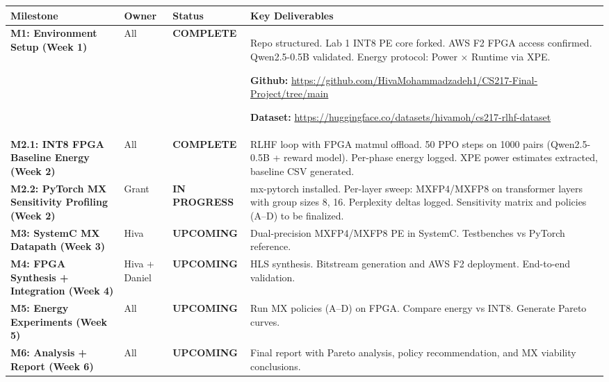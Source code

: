 \documentclass[10pt]{article}
\begin{document}
\begin{table}[H]
\raggedright
\footnotesize
\setlength{\tabcolsep}{4pt}
\renewcommand{\arraystretch}{1.1}
\begin{tabular}{@{}p{3cm}p{1.2cm}p{1.6cm}p{7.5cm}@{}}
\toprule
\textbf{Milestone} & \textbf{Owner} & \textbf{Status} & \textbf{Key Deliverables} \\
\midrule
\textbf{M1: Environment Setup (Week 1)} & All & \cellcolor{green!30}\textbf{COMPLETE} &
Repo structured. Lab 1 INT8 PE core forked. AWS F2 FPGA access confirmed. Qwen2.5-0.5B validated. Energy protocol: Power × Runtime via XPE.

\textbf{Github:} \scriptsize\url{https://github.com/HivaMohammadzadeh1/CS217-Final-Project/tree/main}

\textbf{Dataset:} \scriptsize\url{https://huggingface.co/datasets/hivamoh/cs217-rlhf-dataset} \\
\midrule
\textbf{M2.1: INT8 FPGA Baseline Energy (Week 2)} & All & \cellcolor{green!30}\textbf{COMPLETE} &
RLHF loop with FPGA matmul offload. 50 PPO steps on 1000 pairs (Qwen2.5-0.5B + reward model). Per-phase energy logged. XPE power estimates extracted, baseline CSV generated. \\
\midrule
\textbf{M2.2: PyTorch MX Sensitivity Profiling (Week 2)} & Grant & \cellcolor{orange!50}\textbf{IN PROGRESS} &
mx-pytorch installed. Per-layer sweep: MXFP4/MXFP8 on transformer layers with group sizes 8, 16. Perplexity deltas logged. Sensitivity matrix and policies (A--D) to be finalized. \\
\midrule
\textbf{M3: SystemC MX Datapath (Week 3)} & Hiva & \cellcolor{gray!30}\textbf{UPCOMING} &
Dual-precision MXFP4/MXFP8 PE in SystemC. Testbenches vs PyTorch reference. \\
\midrule
\textbf{M4: FPGA Synthesis + Integration (Week 4)} & Hiva + Daniel & \cellcolor{gray!30}\textbf{UPCOMING} &
HLS synthesis. Bitstream generation and AWS F2 deployment. End-to-end validation. \\
\midrule
\textbf{M5: Energy Experiments (Week 5)} & All & \cellcolor{gray!30}\textbf{UPCOMING} &
Run MX policies (A--D) on FPGA. Compare energy vs INT8. Generate Pareto curves. \\
\midrule
\textbf{M6: Analysis + Report (Week 6)} & All & \cellcolor{gray!30}\textbf{UPCOMING} &
Final report with Pareto analysis, policy recommendation, and MX viability conclusions. \\
\bottomrule
\end{tabular}
\end{table}
\vspace{-0.5em}
\end{document}

